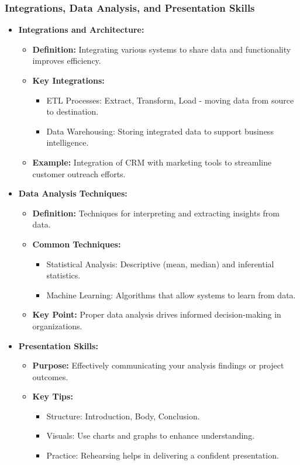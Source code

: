 \documentclass[aspectratio=169]{beamer}
\begin{document}
\begin{frame}[fragile]
    \frametitle{Integrations, Data Analysis, and Presentation Skills}
    \begin{itemize}
        \item \textbf{Integrations and Architecture:}
        \begin{itemize}
            \item \textbf{Definition:} Integrating various systems to share data and functionality improves efficiency.
            \item \textbf{Key Integrations:}
            \begin{itemize}
                \item ETL Processes: Extract, Transform, Load - moving data from source to destination.
                \item Data Warehousing: Storing integrated data to support business intelligence.
            \end{itemize}
            \item \textbf{Example:} Integration of CRM with marketing tools to streamline customer outreach efforts.
        \end{itemize}
        \item \textbf{Data Analysis Techniques:}
        \begin{itemize}
            \item \textbf{Definition:} Techniques for interpreting and extracting insights from data.
            \item \textbf{Common Techniques:}
            \begin{itemize}
                \item Statistical Analysis: Descriptive (mean, median) and inferential statistics.
                \item Machine Learning: Algorithms that allow systems to learn from data.
            \end{itemize}
            \item \textbf{Key Point:} Proper data analysis drives informed decision-making in organizations.
        \end{itemize}
        \item \textbf{Presentation Skills:}
        \begin{itemize}
            \item \textbf{Purpose:} Effectively communicating your analysis findings or project outcomes.
            \item \textbf{Key Tips:}
            \begin{itemize}
                \item Structure: Introduction, Body, Conclusion.
                \item Visuals: Use charts and graphs to enhance understanding.
                \item Practice: Rehearsing helps in delivering a confident presentation.
            \end{itemize}
        \end{itemize}
    \end{itemize}
\end{frame}
\end{document}
